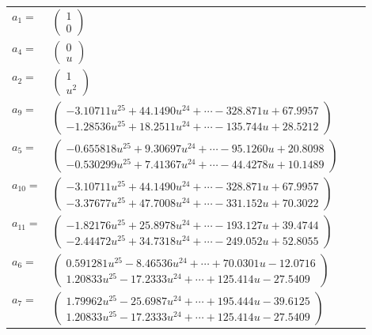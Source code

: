 \documentclass[1p]{elsarticle_modified}
\theoremstyle{definition}
\begin{document}
\begin{tabular}{m{7pt} m{180pt} m{7pt} m{180pt} }
\flushright $a_{1}=$&$\begin{pmatrix}1\\0\end{pmatrix}$ \\
\flushright $a_{4}=$&$\begin{pmatrix}0\\u\end{pmatrix}$ \\
\flushright $a_{2}=$&$\begin{pmatrix}1\\u^2\end{pmatrix}$ \\
\flushright $a_{9}=$&$\begin{pmatrix}-3.10711 u^{25}+44.1490 u^{24}+\cdots-328.871 u+67.9957\\-1.28536 u^{25}+18.2511 u^{24}+\cdots-135.744 u+28.5212\end{pmatrix}$ \\
\flushright $a_{5}=$&$\begin{pmatrix}-0.655818 u^{25}+9.30697 u^{24}+\cdots-95.1260 u+20.8098\\-0.530299 u^{25}+7.41367 u^{24}+\cdots-44.4278 u+10.1489\end{pmatrix}$ \\
\flushright $a_{10}=$&$\begin{pmatrix}-3.10711 u^{25}+44.1490 u^{24}+\cdots-328.871 u+67.9957\\-3.37677 u^{25}+47.7008 u^{24}+\cdots-331.152 u+70.3022\end{pmatrix}$ \\
\flushright $a_{11}=$&$\begin{pmatrix}-1.82176 u^{25}+25.8978 u^{24}+\cdots-193.127 u+39.4744\\-2.44472 u^{25}+34.7318 u^{24}+\cdots-249.052 u+52.8055\end{pmatrix}$ \\
\flushright $a_{6}=$&$\begin{pmatrix}0.591281 u^{25}-8.46536 u^{24}+\cdots+70.0301 u-12.0716\\1.20833 u^{25}-17.2333 u^{24}+\cdots+125.414 u-27.5409\end{pmatrix}$ \\
\flushright $a_{7}=$&$\begin{pmatrix}1.79962 u^{25}-25.6987 u^{24}+\cdots+195.444 u-39.6125\\1.20833 u^{25}-17.2333 u^{24}+\cdots+125.414 u-27.5409\end{pmatrix}$ \\

\end{tabular}
\end{document}
